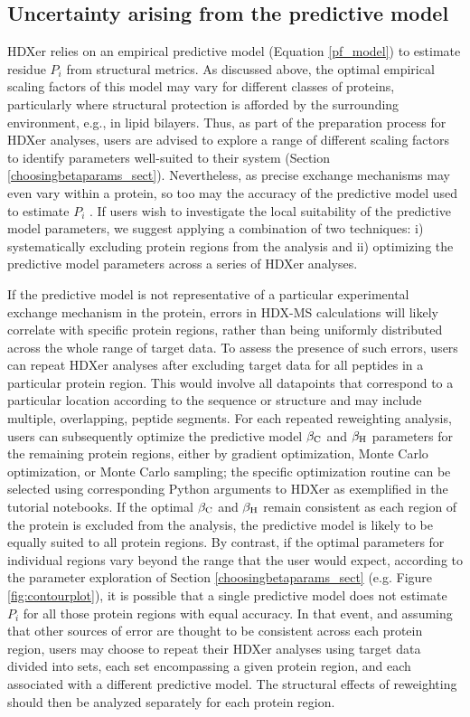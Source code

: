 \documentclass[9pt,tutorial,ASAPversion]{livecoms}
\begin{document}
\subsection{Uncertainty arising from the predictive model}
HDXer relies on an empirical predictive model (Equation \ref{pf_model}) to estimate residue $P_i$ from structural metrics.
As discussed above, the optimal empirical scaling factors of this model may vary for different classes of proteins, particularly where structural protection is afforded by the surrounding environment, e.g., in lipid bilayers.
Thus, as part of the preparation process for HDXer analyses, users are advised to explore a range of different scaling factors to identify parameters well-suited to their system (Section \ref{choosingbetaparams_sect}).
Nevertheless, as precise exchange mechanisms may even vary within a protein, so too may the accuracy of the predictive model used to estimate $P_i$ \cite{Skinner2012models, Mohammadiarani2018, McAllister2015}.
If users wish to investigate the local suitability of the predictive model parameters, we suggest applying a combination of two techniques: i) systematically excluding protein regions from the analysis and ii) optimizing the predictive model parameters across a series of HDXer analyses. 

If the predictive model is not representative of a particular experimental exchange mechanism in the protein, errors in HDX-MS calculations will likely correlate with specific protein regions, rather than being uniformly distributed across the whole range of target data.
To assess the presence of such errors, users can repeat HDXer analyses after excluding target data for all peptides in a particular protein region.
This would involve all datapoints that correspond to a particular location according to the sequence or structure and may include multiple, overlapping, peptide segments.
For each repeated reweighting analysis, users can subsequently optimize the predictive model $\beta_\textnormal{C}$ and $\beta_\textnormal{H}$ parameters for the remaining protein regions, either by gradient optimization, Monte Carlo optimization, or Monte Carlo sampling; the specific optimization routine can be selected using corresponding Python arguments to HDXer as exemplified in the tutorial notebooks.
If the optimal $\beta_\textnormal{C}$ and $\beta_\textnormal{H}$ remain consistent as each region of the protein is excluded from the analysis, the predictive model is likely to be equally suited to all protein regions.
By contrast, if the optimal parameters for individual regions vary beyond the range that the user would expect, according to the parameter exploration of Section \ref{choosingbetaparams_sect} (e.g. Figure \ref{fig:contourplot}), it is possible that a single predictive model does not estimate $P_i$ for all those protein regions with equal accuracy.
In that event, and assuming that other sources of error are thought to be consistent across each protein region, users may choose to repeat their HDXer analyses using target data divided into sets, each set encompassing a given protein region, and each associated with a different predictive model.
The structural effects of reweighting should then be analyzed separately for each protein region.
\end{document}

